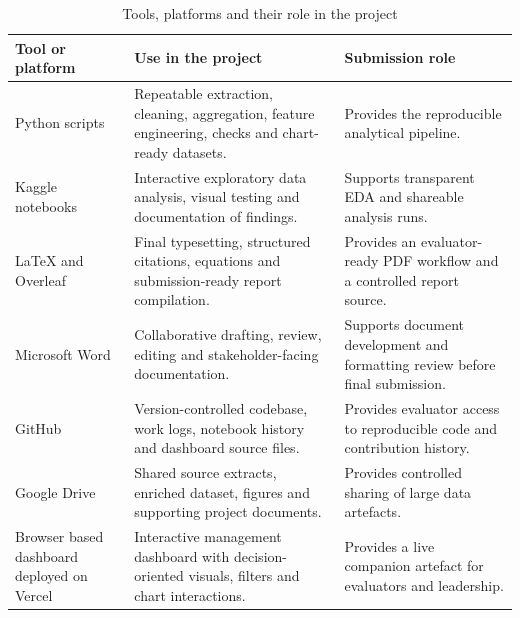\documentclass[11pt,a4paper]{article}
\begin{document}
\begin{table}[h]
\centering
\caption{Tools, platforms and their role in the project}
\begin{tabularx}{\textwidth}{L{3.6cm} L{5.0cm} L{4.9cm}}
\toprule
\textbf{Tool or platform} & \textbf{Use in the project} & \textbf{Submission role} \\
\midrule
Python scripts & Repeatable extraction, cleaning, aggregation, feature engineering, checks and chart-ready datasets. & Provides the reproducible analytical pipeline. \\
Kaggle notebooks & Interactive exploratory data analysis, visual testing and documentation of findings. & Supports transparent EDA and shareable analysis runs. \\
LaTeX and Overleaf & Final typesetting, structured citations, equations and submission-ready report compilation. & Provides an evaluator-ready PDF workflow and a controlled report source. \\
Microsoft Word & Collaborative drafting, review, editing and stakeholder-facing documentation. & Supports document development and formatting review before final submission. \\
GitHub & Version-controlled codebase, work logs, notebook history and dashboard source files. & Provides evaluator access to reproducible code and contribution history. \\
Google Drive & Shared source extracts, enriched dataset, figures and supporting project documents. & Provides controlled sharing of large data artefacts. \\
Browser based dashboard deployed on Vercel & Interactive management dashboard with decision-oriented visuals, filters and chart interactions. & Provides a live companion artefact for evaluators and leadership. \\
\bottomrule
\end{tabularx}
\end{table}
\end{document}
